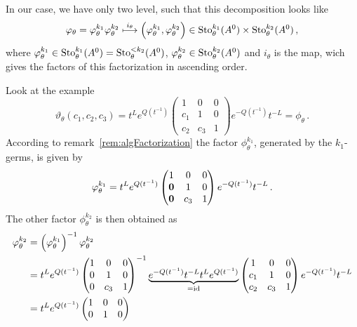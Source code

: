 In our case, we have only two level, such that this decomposition looks like
\[
  \phi_\theta=\phi_\theta^{k_1} \phi_\theta^{k_2}
  \overset{i_\theta}\longmapsto
    \left(\phi_\theta^{k_1},\phi_\theta^{k_2}\right)
      \in\Sto_\theta^{k_1}(A^0)\times\Sto_\theta^{k_2}(A^0) \,,
\]
where $\phi_\theta^{k_1}\in\Sto_\theta^{k_1}(A^0)=\Sto_\theta^{<k_2}(A^0)$,
$\phi_\theta^{k_2}\in\Sto_\theta^{k_2}(A^0)$  and $i_\theta$ is the map, wich
gives the factors of this factorization in ascending order.

\begin{exmp}
  Look at the example
  \[
    \vartheta_\theta(c_1,c_2,c_3)=
    t^{L}e^{Q(t^{-1})}
    \begin{pmatrix}
      1 & 0 & 0
    \\c_1 & 1 & 0
    \\c_2 & c_3 & 1
    \end{pmatrix}
    e^{-Q(t^{-1})}t^{-L}
    =\phi_\theta
    \,.
  \]
  According to remark~\ref{rem:algFactorization} the factor
  $\phi_\theta^{k_1}$, generated by the $k_1$-germs, is given by
  \[
    \phi_\theta^{k_1}=
    t^{L}e^{Q(t^{-1})}
    \begin{pmatrix}
      1 & 0 & 0
    \\\text{\boldmath $0$} & 1 & 0
    \\\text{\boldmath $0$} & c_3 & 1
    \end{pmatrix}
    e^{-Q(t^{-1})}t^{-L} \,.
  \]
  The other factor $\phi_\theta^{k_2}$ is then obtained as
  \begin{align*}
    \phi_\theta^{k_2}&=
    \left(\phi_\theta^{k_1}\right)^{-1}
    \phi_\theta^{k_2}
  \\&=t^{L}e^{Q(t^{-1})}
    \begin{pmatrix}
      1     & 0    & 0
    \\0     & 1    & 0
    \\0     & c_3 & 1
    \end{pmatrix}^{-1}
    \underset{=\id}{\underbrace{%
        e^{-Q(t^{-1})}t^{-L}
        t^{L}e^{Q(t^{-1})}
    }}
    \begin{pmatrix}
      1     & 0 & 0
    \\c_1     & 1     & 0
    \\c_2     & c_3 & 1
    \end{pmatrix}
    e^{-Q(t^{-1})}t^{-L}
  \\&=t^{L}e^{Q(t^{-1})}
    \begin{pmatrix}
      1     & 0    & 0
    \\0     & 1    & 0

\end{pmatrix}
\end{align*}
\end{exmp}
